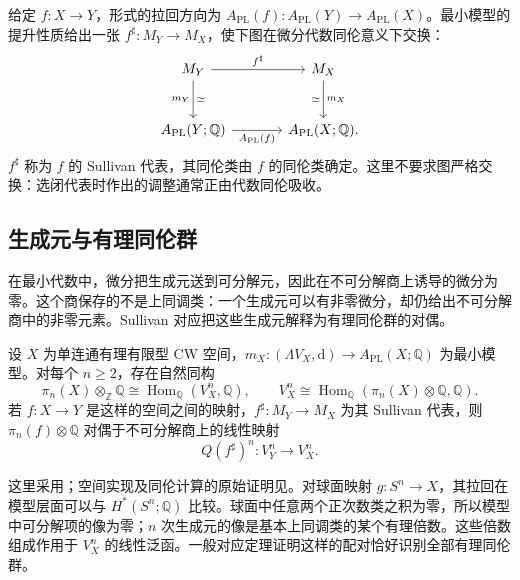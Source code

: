 \ProseParagraphBreak

给定 \(f:X\to Y\)，形式的拉回方向为 \(A_{\mathrm{PL}}(f):A_{\mathrm{PL}}(Y)\to A_{\mathrm{PL}}(X)\)。最小模型的提升性质给出一张 \(f^\sharp:M_Y\to M_X\)，使下图在微分代数同伦意义下交换：
\[
	\begin{tikzcd}[column sep=large,row sep=large]
		M_Y\arrow[r,"f^\sharp"]\arrow[d,"m_Y"',"\simeq"] & M_X\arrow[d,"m_X","\simeq"']\\
		A_{\mathrm{PL}}(Y;\mathbb Q)\arrow[r,"A_{\mathrm{PL}}(f)"'] & A_{\mathrm{PL}}(X;\mathbb Q).
	\end{tikzcd}
\]
\(f^\sharp\) 称为 \(f\) 的 Sullivan 代表，其同伦类由 \(f\) 的同伦类确定。这里不要求图严格交换：选闭代表时作出的调整通常正由代数同伦吸收。

\subsection{生成元与有理同伦群}
\label{g2:subsec:E02:04}

在最小代数中，微分把生成元送到可分解元，因此在不可分解商上诱导的微分为零。这个商保存的不是上同调类：一个生成元可以有非零微分，却仍给出不可分解商中的非零元素。Sullivan 对应把这些生成元解释为有理同伦群的对偶。

\begin{theorem}\label{g2:thm:sullivan-homotopy-correspondence}
	设 \(X\) 为单连通有理有限型 CW 空间，\(m_X:(\Lambda V_X,\mathrm d)\to A_{\mathrm{PL}}(X;\mathbb Q)\) 为最小模型。对每个 \(n\ge2\)，存在自然同构
	\[
		\pi_n(X)\otimes_{\mathbb Z}\mathbb Q\cong\operatorname{Hom}_{\mathbb Q}(V_X^n,\mathbb Q),
		\qquad V_X^n\cong\operatorname{Hom}_{\mathbb Q}(\pi_n(X)\otimes\mathbb Q,\mathbb Q).
	\]
	若 \(f:X\to Y\) 是这样的空间之间的映射，\(f^\sharp:M_Y\to M_X\) 为其 Sullivan 代表，则 \(\pi_n(f)\otimes\mathbb Q\) 对偶于不可分解商上的线性映射
	\[
		Q(f^\sharp)^n:V_Y^n\longrightarrow V_X^n.
	\]
\end{theorem}

这里采用\cite[第4节，定理4.1及之前的构造，第19页]{FelixHalperin2017SullivanModels}；空间实现及同伦计算的原始证明见\cite[第8节，定理8.1，第301—303页；第10节，定理10.1，第307页]{Sullivan1977Infinitesimal}。对球面映射 \(g:S^n\to X\)，其拉回在模型层面可以与 \(H^*(S^n;\mathbb Q)\) 比较。球面中任意两个正次数类之积为零，所以模型中可分解项的像为零；\(n\) 次生成元的像是基本上同调类的某个有理倍数。这些倍数组成作用于 \(V_X^n\) 的线性泛函。一般对应定理证明这样的配对恰好识别全部有理同伦群。

\ProseParagraphBreak

